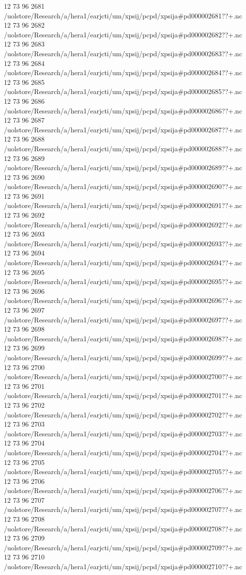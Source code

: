 12 73 96
2681
/uolstore/Research/a/hera1/earjcti/um/xpsij/pcpd/xpsija#pd000002681??+.nc
12 73 96
2682
/uolstore/Research/a/hera1/earjcti/um/xpsij/pcpd/xpsija#pd000002682??+.nc
12 73 96
2683
/uolstore/Research/a/hera1/earjcti/um/xpsij/pcpd/xpsija#pd000002683??+.nc
12 73 96
2684
/uolstore/Research/a/hera1/earjcti/um/xpsij/pcpd/xpsija#pd000002684??+.nc
12 73 96
2685
/uolstore/Research/a/hera1/earjcti/um/xpsij/pcpd/xpsija#pd000002685??+.nc
12 73 96
2686
/uolstore/Research/a/hera1/earjcti/um/xpsij/pcpd/xpsija#pd000002686??+.nc
12 73 96
2687
/uolstore/Research/a/hera1/earjcti/um/xpsij/pcpd/xpsija#pd000002687??+.nc
12 73 96
2688
/uolstore/Research/a/hera1/earjcti/um/xpsij/pcpd/xpsija#pd000002688??+.nc
12 73 96
2689
/uolstore/Research/a/hera1/earjcti/um/xpsij/pcpd/xpsija#pd000002689??+.nc
12 73 96
2690
/uolstore/Research/a/hera1/earjcti/um/xpsij/pcpd/xpsija#pd000002690??+.nc
12 73 96
2691
/uolstore/Research/a/hera1/earjcti/um/xpsij/pcpd/xpsija#pd000002691??+.nc
12 73 96
2692
/uolstore/Research/a/hera1/earjcti/um/xpsij/pcpd/xpsija#pd000002692??+.nc
12 73 96
2693
/uolstore/Research/a/hera1/earjcti/um/xpsij/pcpd/xpsija#pd000002693??+.nc
12 73 96
2694
/uolstore/Research/a/hera1/earjcti/um/xpsij/pcpd/xpsija#pd000002694??+.nc
12 73 96
2695
/uolstore/Research/a/hera1/earjcti/um/xpsij/pcpd/xpsija#pd000002695??+.nc
12 73 96
2696
/uolstore/Research/a/hera1/earjcti/um/xpsij/pcpd/xpsija#pd000002696??+.nc
12 73 96
2697
/uolstore/Research/a/hera1/earjcti/um/xpsij/pcpd/xpsija#pd000002697??+.nc
12 73 96
2698
/uolstore/Research/a/hera1/earjcti/um/xpsij/pcpd/xpsija#pd000002698??+.nc
12 73 96
2699
/uolstore/Research/a/hera1/earjcti/um/xpsij/pcpd/xpsija#pd000002699??+.nc
12 73 96
2700
/uolstore/Research/a/hera1/earjcti/um/xpsij/pcpd/xpsija#pd000002700??+.nc
12 73 96
2701
/uolstore/Research/a/hera1/earjcti/um/xpsij/pcpd/xpsija#pd000002701??+.nc
12 73 96
2702
/uolstore/Research/a/hera1/earjcti/um/xpsij/pcpd/xpsija#pd000002702??+.nc
12 73 96
2703
/uolstore/Research/a/hera1/earjcti/um/xpsij/pcpd/xpsija#pd000002703??+.nc
12 73 96
2704
/uolstore/Research/a/hera1/earjcti/um/xpsij/pcpd/xpsija#pd000002704??+.nc
12 73 96
2705
/uolstore/Research/a/hera1/earjcti/um/xpsij/pcpd/xpsija#pd000002705??+.nc
12 73 96
2706
/uolstore/Research/a/hera1/earjcti/um/xpsij/pcpd/xpsija#pd000002706??+.nc
12 73 96
2707
/uolstore/Research/a/hera1/earjcti/um/xpsij/pcpd/xpsija#pd000002707??+.nc
12 73 96
2708
/uolstore/Research/a/hera1/earjcti/um/xpsij/pcpd/xpsija#pd000002708??+.nc
12 73 96
2709
/uolstore/Research/a/hera1/earjcti/um/xpsij/pcpd/xpsija#pd000002709??+.nc
12 73 96
2710
/uolstore/Research/a/hera1/earjcti/um/xpsij/pcpd/xpsija#pd000002710??+.nc
